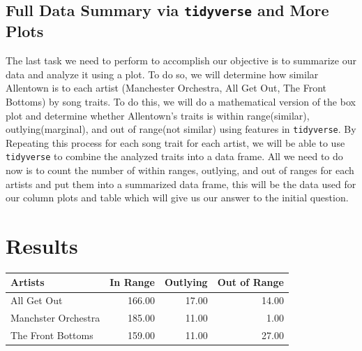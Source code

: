 \documentclass{article}\usepackage[]{graphicx}\usepackage[]{xcolor}
\begin{document}
\begin{multicols}{2}
\subsection{Full Data Summary via \texttt{tidyverse} and More Plots}
The last task we need to perform to accomplish our objective is to summarize our data and analyze it using a plot. To do so, we will determine how similar Allentown is to each artist (Manchester Orchestra, All Get Out, The Front Bottoms) by song traits. To do this, we will do a mathematical version of the box plot and determine whether Allentown's traits is within range(similar), outlying(marginal), and out of range(not similar) using features in \texttt{tidyverse}. By Repeating this process for each song trait for each artist, we will be able to use \texttt{tidyverse} to combine the analyzed traits into a data frame. All we need to do now is to count the number of within ranges, outlying, and out of ranges for each artists and put them into a summarized data frame, this will be the data used for our column plots and table which will give us our answer to the initial question. 

\pagebreak

\end{multicols}

\section{Results}


\begin{table}[H]
\centering
\begingroup\small
\begin{tabular}{lrrr}
  \hline
Artists & In Range & Outlying & Out of Range \\ 
  \hline
All Get Out & 166.00 & 17.00 & 14.00 \\ 
  Manchster Orchestra & 185.00 & 11.00 & 1.00 \\ 
  The Front Bottoms & 159.00 & 11.00 & 27.00 \\ 
   \hline
\end{tabular}
\endgroup
\end{table}
\end{document}
